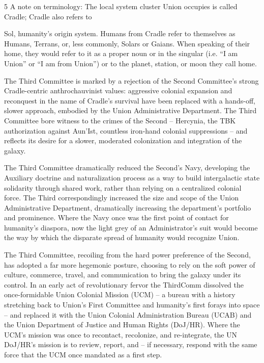 5 A note on terminology: The local system cluster Union occupies is called Cradle; Cradle also refers to  

Sol, humanity’s origin system. Humans from Cradle refer to themselves as Humans, Terrans, or, less  
commonly, Solars or Gaians. When speaking of their home, they would refer to it as a proper noun or in the  
singular (i.e. “I am Union” or “I am from Union”) or to the planet, station, or moon they call home. 

                                                                                                                 


The Third Committee is marked by a rejection of the Second Committee’s strong Cradle-centric  
anthrochauvinist values: aggressive colonial expansion and reconquest in the name of Cradle’s  
survival have been replaced with a hands-off, slower approach, embodied by the Union  
Administrative Department. The Third Committee bore witness to the crimes of the Second --  
Hercynia, the TBK authorization against Aun’Ist, countless iron-hand colonial suppressions -- and  
reflects its desire for a slower, moderated colonization and integration of the galaxy.   

The Third Committee dramatically reduced the Second’s Navy, developing the Auxiliary doctrine  
and naturalization process as a way to build intergalactic state solidarity through shared work,  
rather than relying on a centralized colonial force. The Third correspondingly increased the size  
and scope of the Union Administrative Department, dramatically increasing the department’s  
portfolio and prominence. Where the Navy once was the first point of contact for humanity’s  
diaspora, now the light grey of an Administrator’s suit would become the way by which the  
disparate spread of humanity would recognize Union.   

The Third Committee, recoiling from the hard power preference of the Second, has adopted a far  
more hegemonic posture, choosing to rely on the soft power of culture, commerce, travel, and  
communication to bring the galaxy under its control. In an early act of revolutionary fervor the  
ThirdComm dissolved the once-formidable Union Colonial Mission (UCM) -- a bureau with a  
history stretching back to Union’s First Committee and humanity’s first forays into space -- and  
replaced it with the Union Colonial Administration Bureau (UCAB) and the Union Department of  
Justice and Human Rights (DoJ/HR). Where the UCM’s mission was once to recontact,  
recolonize, and re-integrate, the UN DoJ/HR’s mission is to review, report, and -- if necessary,  
respond with the same force that the UCM once mandated as a first step.   

